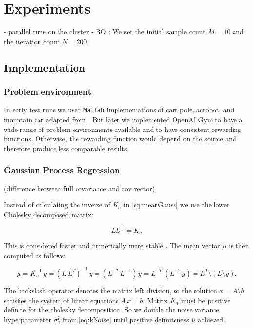 \chapter{Experiments}
\label{chap:4}
%

- parallel runs on the cluster
- BO : We set the initial sample count $M = 10$ and the iteration count $N = 200$.

\section{Implementation}

\subsection{Problem environment}
In early test runs we used \texttt{Matlab} implementations of cart pole, acrobot, and mountain car adapted from \cite{joseCode}. But later we implemented OpenAI Gym to have a wide range of problem environments available and to have consistent rewarding functions. Otherwise, the rewarding function would depend on the source and therefore produce less comparable results.



\subsection{Gaussian Process Regression}

(difference between full covariance and cov vector)

Instead of calculating the inverse of $K_n$ in \eqref{eq:meanGauss} we use the lower Cholesky decomposed matrix:

$$LL^\top=K_n$$

This is considered faster and numerically more stable \cite{rasmussen2006gaussian}. The mean vector $\mu$ is then computed as follows:

\begin{equation} \label{eq:regression}
    \mu = K_n^{-1}\,y = (L\,L^{T})^{-1}\,y = (L^{-T}\,L^{-1})\,y = L^{-T}\,(L^{-1}\,y) = L^{T}\setminus(L \setminus y).
\end{equation}

The backslash operator denotes the matrix left division, so the solution $x=A\setminus b$ satisfies the system of linear equations $A\,x=b$.
Matrix $K_n$ must be positive definite for the cholesky decomposition. So we double the noise variance hyperparameter $\sigma_n^2$ from \eqref{eq:kNoise} until positive definiteness is achieved.

